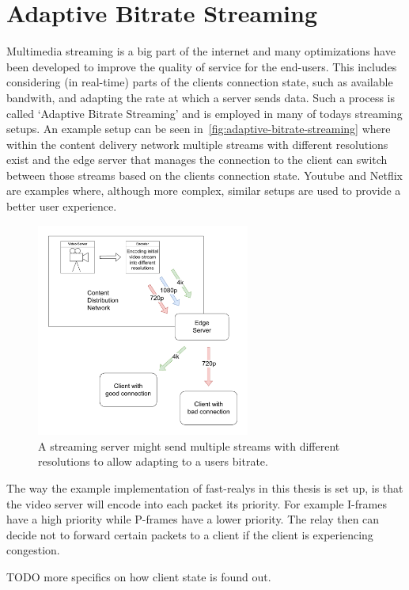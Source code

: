 \section{Adaptive Bitrate Streaming}\label{sec:adaptive_bitrate_streaming}
Multimedia streaming is a big part of the internet and many optimizations have
been developed to improve the quality of service for the end-users.
This includes considering (in real-time) parts of the clients connection state, 
such as available bandwith, and adapting the rate at which a server sends data.
Such a process is called `Adaptive Bitrate Streaming' and is employed in many 
of todays streaming setups.
An example setup can be seen in~\autoref{fig:adaptive-bitrate-streaming} where
within the content delivery network multiple streams with different resolutions
exist and the edge server that manages the connection to the client can switch
between those streams based on the clients connection state.
Youtube and Netflix are examples where, although more complex, similar setups
are used to provide a better user experience. 

\begin{figure}[htbp]
    \centering
    \includegraphics[width=7cm]{figures/02_background/adaptive-bitrate-streaming.drawio.pdf}
    \caption{A streaming server might send multiple streams with different
    resolutions to allow adapting to a users bitrate.}\label{fig:adaptive-bitrate-streaming}
\end{figure}

The way the example implementation of fast-realys in this thesis is set up,
is that the video server will encode into each packet its priority.
For example I-frames have a high priority while P-frames have a lower
priority.
The relay then can decide not to forward certain packets to a client if
the client is experiencing congestion.

TODO more specifics on how client state is found out.